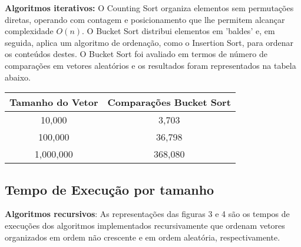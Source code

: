 \documentclass[conference]{IEEEtran}
\begin{document}
\vspace{0.3cm}


\textbf{Algoritmos iterativos:} O Counting Sort organiza elementos sem permutações diretas, operando com contagem e posicionamento que lhe permitem alcançar complexidade \( O(n) \). O Bucket Sort distribui elementos em 'baldes' e, em seguida, aplica um algoritmo de ordenação, como o Insertion Sort, para ordenar os conteúdos destes. O Bucket Sort foi avaliado em termos de número de comparações em vetores aleatórios e os resultados foram representados na tabela abaixo.

\begin{table}[ht]
\centering
\label{tab:bucket_sort_comparisons}
\begin{tabular}{@{}cc@{}}
\toprule
Tamanho do Vetor & Comparações Bucket Sort \\ \midrule
10,000           & 3,703                   \\
100,000          & 36,798                  \\
1,000,000        & 368,080                 \\ \bottomrule
\end{tabular}
\end{table}

\vspace{-0.5cm}
\subsection{Tempo de Execução por tamanho}

\vspace{0.1cm}
\textbf{Algoritmos recursivos}: As representações das figuras 3 e 4 são os tempos de execuções dos algoritmos implementados recursivamente que ordenam vetores organizados em ordem não crescente e em ordem aleatória, respectivamente.  
\end{document}
